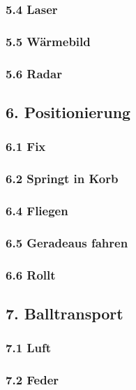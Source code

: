 \subsubsection{5.4 Laser}

\subsubsection{5.5 Wärmebild}

\subsubsection{5.6 Radar}

\subsection{6. Positionierung}

\subsubsection{6.1 Fix}

\subsubsection{6.2 Springt in Korb}

\subsubsection{6.4 Fliegen}

\subsubsection{6.5 Geradeaus fahren}

\subsubsection{6.6 Rollt}

\subsection{7. Balltransport}

\subsubsection{7.1 Luft}

\subsubsection{7.2 Feder}

